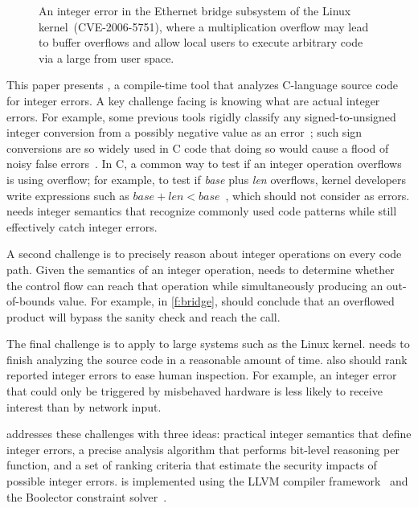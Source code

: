 \begin{figure}[t]
\centering

\vspace{-1em}
\caption{An integer error in the Ethernet bridge subsystem of the
Linux kernel~(CVE-2006-5751), where a multiplication overflow
may lead to buffer overflows and allow local users to execute
arbitrary code via a large  from user space.
}
\label{f:bridge}
\end{figure}

This paper presents \sys, a compile-time tool that analyzes C-language
source code for integer errors.
%
A key challenge facing \sys is knowing what are actual integer errors.  For
example, some previous tools rigidly classify any signed-to-unsigned integer
conversion from a possibly negative value as an error~\cite{brumley:rich,
  moy:z3prefix, seacord:secure-c}; such sign conversions are so widely used in C
code that doing so would cause a flood of noisy false
errors~\cite[\subsectionautorefname~6.2]{moy:z3prefix}.  In C, a common way to
test if an integer operation overflows is using overflow; for example, to test
if \textit{base} plus \textit{len} overflows, kernel developers write
expressions such as $\mathit{base} + \mathit{len} < \mathit{base}$~\cite{ioc},
which \sys should not consider as
errors.  \sys needs integer semantics that recognize commonly used code patterns
while still effectively catch integer errors.

A second challenge is to precisely reason about integer operations
on every code path.  Given the semantics of an integer operation,
\sys needs to determine whether the control flow can reach that
operation while simultaneously producing an out-of-bounds value.  For
example, in \autoref{f:bridge}, \sys should conclude that an overflowed
product  will bypass the sanity check and reach the
 call.

The final challenge is to apply \sys to large systems such as the
Linux kernel.  \sys needs to finish analyzing the source code in a
reasonable amount of time.  \sys also should rank reported integer
errors to ease human inspection.  For example, an integer error
that could only be triggered by misbehaved hardware is
less likely to receive interest than by network input.

\sys addresses these challenges with three ideas: practical integer
semantics that define integer errors, a precise analysis algorithm
that performs bit-level reasoning per function, and a set of ranking
criteria that estimate the security impacts of possible integer
errors.  \sys
%
is implemented using the LLVM compiler framework~\cite{lattner:llvm}
and the Boolector constraint solver~\cite{boolector}.
%

